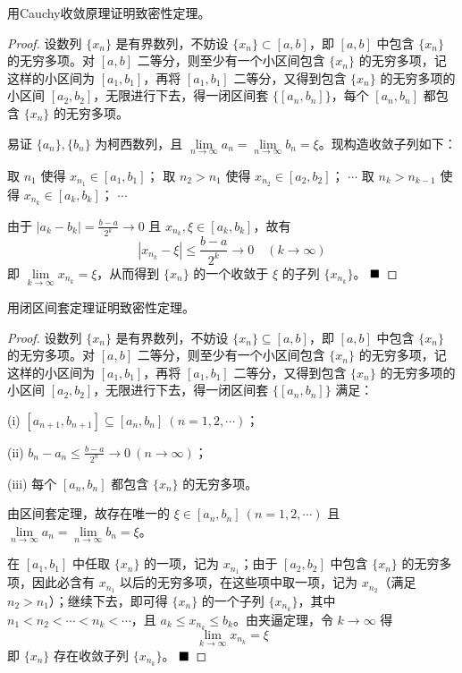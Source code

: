  \begin{problem}
    用Cauchy收敛原理证明致密性定理。
 \end{problem}

 \begin{proof}
    设数列 $\{x_n\}$ 是有界数列，不妨设 $\{x_n\} \subset [a,b]$，即 $[a,b]$ 中包含 $\{x_n\}$ 的无穷多项。对 $[a,b]$ 二等分，则至少有一个小区间包含 $\{x_n\}$ 的无穷多项，记这样的小区间为 $[a_1, b_1]$，再将 $[a_1, b_1]$ 二等分，又得到包含 $\{x_n\}$ 的无穷多项的小区间 $[a_2, b_2]$，无限进行下去，得一闭区间套 $\{[a_n, b_n]\}$，每个 $[a_n, b_n]$ 都包含 $\{x_n\}$ 的无穷多项。
    
    易证 $\{a_n\}, \{b_n\}$ 为柯西数列，且 $\lim\limits_{n \to \infty} a_n = \lim\limits_{n \to \infty} b_n = \xi$。现构造收敛子列如下：
    
    取 $n_1$ 使得 $x_{n_1} \in [a_1,b_1]$；
    取 $n_2 > n_1$ 使得 $x_{n_2} \in [a_2,b_2]$；
    $\cdots$
    取 $n_k > n_{k-1}$ 使得 $x_{n_k} \in [a_k,b_k]$；
    $\cdots$
    
    由于 $|a_k - b_k| = \frac{b-a}{2^k} \to 0$ 且 $x_{n_k}, \xi \in [a_k,b_k]$，故有
    $$|x_{n_k} - \xi| \leq \frac{b-a}{2^k} \to 0 \quad (k \to \infty)$$
    即 $\lim\limits_{k \to \infty} x_{n_k} = \xi$，从而得到 $\{x_n\}$ 的一个收敛于 $\xi$ 的子列 $\{x_{n_k}\}$。 $\hfill \blacksquare$
\end{proof}

\begin{problem}
    用闭区间套定理证明致密性定理。
\end{problem}

\begin{proof}
    设数列 $\{x_n\}$ 是有界数列，不妨设 $\{x_n\} \subseteq [a,b]$，即 $[a,b]$ 中包含 $\{x_n\}$ 的无穷多项。对 $[a,b]$ 二等分，则至少有一个小区间包含 $\{x_n\}$ 的无穷多项，记这样的小区间为 $[a_1,b_1]$，再将 $[a_1,b_1]$ 二等分，又得到包含 $\{x_n\}$ 的无穷多项的小区间 $[a_2,b_2]$，无限进行下去，得一闭区间套 $\{[a_n,b_n]\}$ 满足：
    
    (i) $[a_{n+1},b_{n+1}] \subseteq [a_n,b_n] \ (n=1,2,\cdots)$；
    
    (ii) $b_n - a_n \leq \frac{b-a}{2^n} \to 0 \ (n \to \infty)$；
    
    (iii) 每个 $[a_n,b_n]$ 都包含 $\{x_n\}$ 的无穷多项。
    
    由区间套定理，故存在唯一的 $\xi \in [a_n,b_n] \ (n=1,2,\cdots)$ 且 $\lim\limits_{n \to \infty} a_n = \lim\limits_{n \to \infty} b_n = \xi$。
    
    在 $[a_1,b_1]$ 中任取 $\{x_n\}$ 的一项，记为 $x_{n_1}$；由于 $[a_2,b_2]$ 中包含 $\{x_n\}$ 的无穷多项，因此必含有 $x_{n_1}$ 以后的无穷多项，在这些项中取一项，记为 $x_{n_2}$（满足 $n_2 > n_1$）；继续下去，即可得 $\{x_n\}$ 的一个子列 $\{x_{n_k}\}$，其中 $n_1 < n_2 < \cdots < n_k < \cdots$，且 $a_k \leq x_{n_k} \leq b_k$。由夹逼定理，令 $k \to \infty$ 得
    $$\lim\limits_{k \to \infty} x_{n_k} = \xi$$
    即 $\{x_n\}$ 存在收敛子列 $\{x_{n_k}\}$。 $\hfill \blacksquare$
\end{proof}

